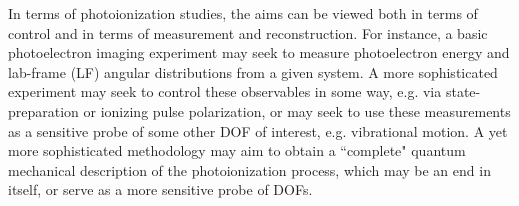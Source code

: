 In terms of photoionization studies, the aims can be viewed both in terms of control and in terms of measurement and reconstruction. For instance, a basic photoelectron imaging experiment may seek to measure photoelectron energy and lab-frame (LF) angular distributions from a given system. A more sophisticated experiment may seek to control these observables in some way, e.g. via state-preparation or ionizing pulse polarization, or may seek to use these measurements as a sensitive probe of some other DOF of interest, e.g. vibrational motion. A yet more sophisticated methodology may aim to obtain a ``complete" quantum mechanical description of the photoionization process, which may be an end in itself, or serve as a more sensitive probe of DOFs.